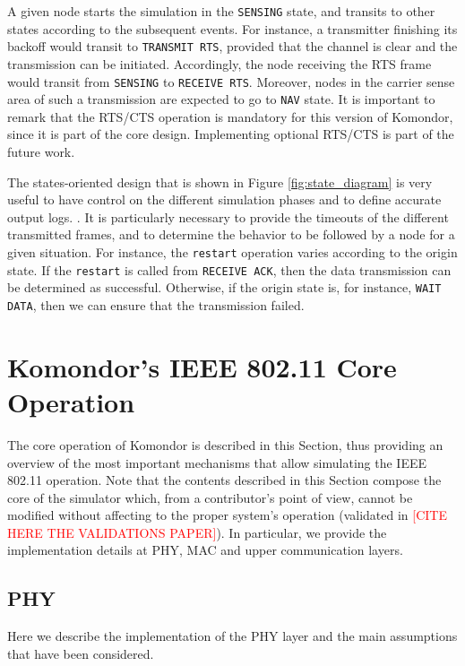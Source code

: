 \documentclass[a4paper]{article}
\begin{document}
A given node starts the simulation in the \texttt{SENSING} state, and transits to other states according to the subsequent events. For instance, a transmitter finishing its backoff would transit to \texttt{TRANSMIT RTS}, provided that the channel is clear and the transmission can be initiated. Accordingly, the node receiving the RTS frame would transit from \texttt{SENSING} to \texttt{RECEIVE RTS}. Moreover, nodes in the carrier sense area of such a transmission are expected to go to \texttt{NAV} state. It is important to remark that the RTS/CTS operation is mandatory for this version of Komondor, since it is part of the core design. Implementing optional RTS/CTS is part of the future work.

The states-oriented design that is shown in Figure \ref{fig:state_diagram} is very useful to have control on the different simulation phases and to define accurate output logs. . It is particularly necessary to provide the timeouts of the different transmitted frames, and to determine the behavior to be followed by a node for a given situation. For instance, the \texttt{restart} operation varies according to the origin state. If the \texttt{restart} is called from \texttt{RECEIVE ACK}, then the data transmission can be determined as successful. Otherwise, if the origin state is, for instance, \texttt{WAIT DATA}, then we can ensure that the transmission failed.

\section{Komondor's IEEE 802.11 Core Operation}
\label{section:core_operation}
The core operation of Komondor is described in this Section, thus providing an overview of the most important mechanisms that allow simulating the IEEE 802.11 operation. Note that the contents described in this Section compose the core of the simulator which, from a contributor's point of view, cannot be modified without affecting to the proper system's operation (validated in \textcolor{red}{[CITE HERE THE VALIDATIONS PAPER]}). In particular, we provide the implementation details at PHY,  MAC and upper communication layers.

\subsection{PHY}
\label{section:phy}
Here we describe the implementation of the PHY layer and the main assumptions that have been considered.
	
\end{document}
